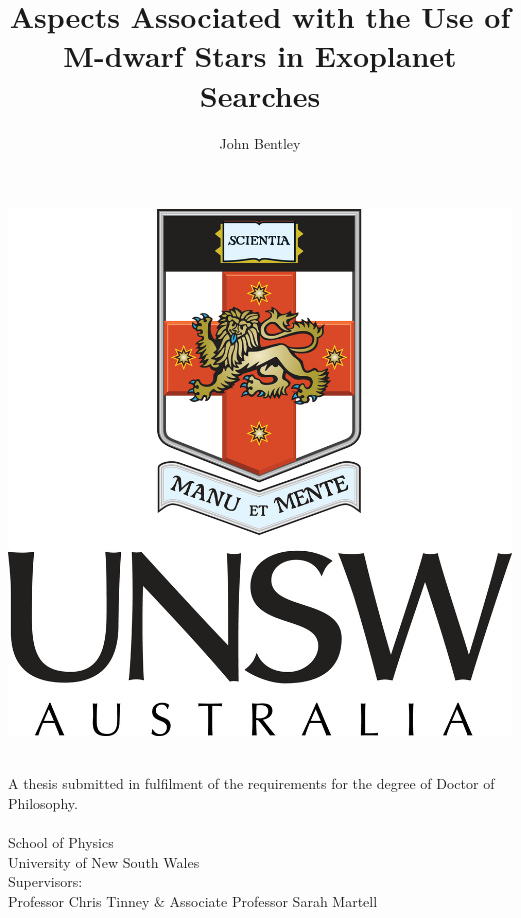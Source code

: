 \documentclass [11pt,twoside]{report}
\title{Aspects Associated with the Use of M-dwarf Stars in Exoplanet Searches}
\author{John Bentley}
\begin{document}
\begin{titlingpage}
\begin{center}
\includegraphics[scale=0.1]{UNSW_coat_of_arms.png}\\
\vspace{2cm}
\begin{Large} 
\textbf{\thetitle}\\
\vspace{1cm}
A thesis submitted in fulfilment of the requirements for the degree of Doctor of Philosophy.\\
\vspace{1cm}
\theauthor\\
School of Physics\\
University of New South Wales\\
\vspace{1cm}
Supervisors:\\
Professor Chris Tinney \& Associate Professor Sarah Martell
\end{Large}
\end{center}
\end{titlingpage}
%
\tableofcontents
\listoffigures
\listoftables








\typeout{}

\end{document}
